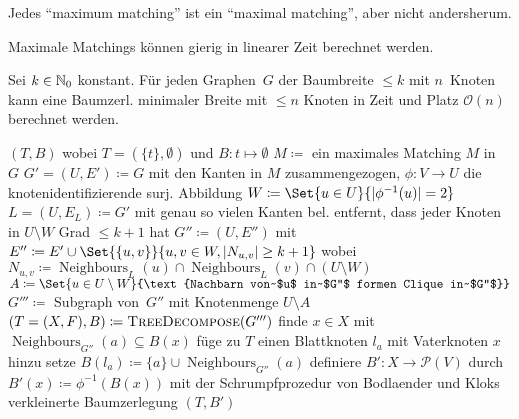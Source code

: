 \documentclass{cheat-sheet}
\newcommand{\size}[1]{\abs{#1}} %
\newcommand{\Powerset}{\mathcal{P}} %
\renewcommand{\O}{\mathcal{O}} %
\DeclareMathOperator{\Neighbours}{Neighbours} %
\newcommand{\IndentState}[1]{\State \quad #1}
\newcommand{\Youtube}[1]{\href{https://www.youtube.com/watch?v=#1}{\textcolor{YoutubeColor}{$\blacktriangleright$}}}
\begin{document}
\begin{acht}[\Youtube{03PUwWef2Dg}, \Youtube{bOJC93XxoFc}]
  Jedes ``maximum matching'' ist ein ``maximal matching'', aber nicht andersherum.
\end{acht}

\begin{bem}[\Youtube{jtgBCGVux-8}]
  Maximale Matchings können gierig in linearer Zeit berechnet werden.
\end{bem}

\begin{satz}
  Sei $k \in \mathbb{N}_0$ konstant.
  Für jeden Graphen~$G$ der Baumbreite $\leq k$ mit $n$~Knoten kann eine Baumzerl. minimaler Breite mit $\leq n$ Knoten in Zeit und Platz $\O(n)$ berechnet werden.
\end{satz}

\begin{algorithmic}
     \Return $(T, B)$ wobei $T = (\{ t \}, \emptyset)$ und $B : t \mapsto \emptyset$ \EndIf
    \State $M \coloneqq $ ein maximales Matching $M$ in~$G$
    \State $G' = (U, E') \coloneqq G$ mit den Kanten in $M$ zusammengezogen,
    \IndentState $\phi : V \to U$ die knotenidentifizierende surj. Abbildung
    \State $W \coloneqq \Set{u \in U}{\size{\phi^{-1}(u)} = 2}$
    \State $L = (U, E_L) \coloneqq G'$ mit genau so vielen Kanten bel. entfernt,
    \IndentState dass jeder Knoten in $U \setminus W$ Grad $\leq k + 1$ hat
    \State $G'' \coloneqq (U, E'')$ mit $E'' \coloneqq E' \cup \Set{\{ u, v \}}{u, v \in W, \size{N_{u,v}} \geq k+1}$
    \IndentState wobei $N_{u,v} \coloneqq \Neighbours_L(u) \cap \Neighbours_L(v) \cap (U \setminus W)$
    \State $A \coloneqq \Set{u \in U \setminus W}{\text{Nachbarn von~$u$ in~$G''$ formen Clique in~$G''$}}$
    \State $G''' \coloneqq$ Subgraph von~$G''$ mit Knotenmenge $U \setminus A$
    \State $(T = (X, F), B) \coloneqq \Call{TreeDecompose}{G'''}$
      \State finde $x \in X$ mit $\Neighbours_{G''}(a) \subseteq B(x)$
      \State füge zu $T$ einen Blattknoten $l_a$ mit Vaterknoten $x$ hinzu
      \State setze $B(l_a) \coloneqq \{ a \} \cup \Neighbours_{G''}(a)$
    \EndFor
    \State definiere $B' : X \to \Powerset(V)$ durch $B'(x) \coloneqq \phi^{-1}(B(x))$
    \State \Return mit der Schrumpfprozedur von Bodlaender und Kloks
    \IndentState verkleinerte Baumzerlegung $(T, B')$
  \EndFunction
\end{algorithmic}
\end{document}
